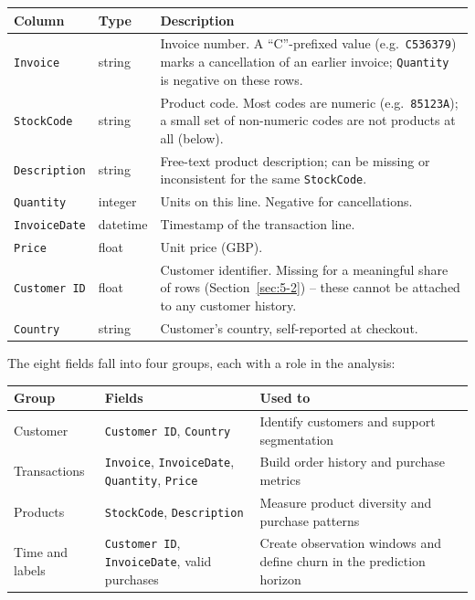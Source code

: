 \begin{center}
\begin{tabular}{@{}p{2.6cm}p{2cm}p{10cm}@{}}
    \toprule
    Column & Type & Description \\
    \midrule
    \texttt{Invoice} & string & Invoice number. A ``C''-prefixed value (e.g.\ \texttt{C536379}) marks a cancellation of an earlier invoice; \texttt{Quantity} is negative on these rows. \\
    \texttt{StockCode} & string & Product code. Most codes are numeric (e.g.\ \texttt{85123A}); a small set of non-numeric codes are not products at all (below). \\
    \texttt{Description} & string & Free-text product description; can be missing or inconsistent for the same \texttt{StockCode}. \\
    \texttt{Quantity} & integer & Units on this line. Negative for cancellations. \\
    \texttt{InvoiceDate} & datetime & Timestamp of the transaction line. \\
    \texttt{Price} & float & Unit price (GBP). \\
    \texttt{Customer ID} & float & Customer identifier. Missing for a meaningful share of rows (Section~\ref{sec:5-2}) -- these cannot be attached to any customer history. \\
    \texttt{Country} & string & Customer's country, self-reported at checkout. \\
    \bottomrule
\end{tabular}
\end{center}

The eight fields fall into four groups, each with a role in the analysis:

\begin{center}
\begin{tabular}{@{}p{2.6cm}p{5cm}p{6.8cm}@{}}
    \toprule
    Group & Fields & Used to \\
    \midrule
    Customer & \texttt{Customer ID}, \texttt{Country} & Identify customers and support segmentation \\
    Transactions & \texttt{Invoice}, \texttt{InvoiceDate}, \texttt{Quantity}, \texttt{Price} & Build order history and purchase metrics \\
    Products & \texttt{StockCode}, \texttt{Description} & Measure product diversity and purchase patterns \\
    Time and labels & \texttt{Customer ID}, \texttt{InvoiceDate}, valid purchases & Create observation windows and define churn in the prediction horizon \\
    \bottomrule
\end{tabular}
\end{center}

